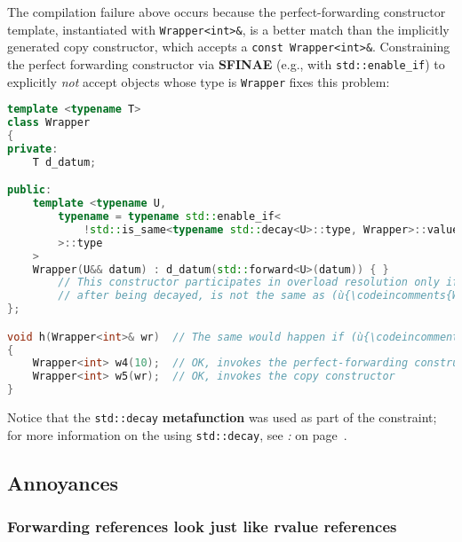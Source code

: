 \noindent The compilation failure above occurs because the perfect-forwarding
constructor template, instantiated with \texttt{Wrapper<int>\&}, is a
better match than the implicitly generated copy constructor, which
accepts a \texttt{const}~\texttt{Wrapper<int>\&}. Constraining the
perfect forwarding constructor via \textbf{SFINAE} (e.g., with
\texttt{std::enable\_if}) to explicitly \emph{not} accept objects whose
type is \texttt{Wrapper} fixes this problem:

\begin{lstlisting}[language=C++]
template <typename T>
class Wrapper
{
private:
    T d_datum;

public:
    template <typename U,
        typename = typename std::enable_if<
            !std::is_same<typename std::decay<U>::type, Wrapper>::value
        >::type
    >
    Wrapper(U&& datum) : d_datum(std::forward<U>(datum)) { }
        // This constructor participates in overload resolution only if (ù{\codeincomments{U}}ù),
        // after being decayed, is not the same as (ù{\codeincomments{Wrapper}}ù).
};

void h(Wrapper<int>& wr)  // The same would happen if (ù{\codeincomments{wr}}ù) were passed by value.
{
    Wrapper<int> w4(10);  // OK, invokes the perfect-forwarding constructor
    Wrapper<int> w5(wr);  // OK, invokes the copy constructor
}
\end{lstlisting}
    
\noindent Notice that the \texttt{std::decay} \textbf{metafunction} was used as
part of the constraint; for more information on the using
\texttt{std::decay}, see \textit{: } on page~\pageref{metafunctions-are-required-in-constraints}.

\subsection[Annoyances]{Annoyances}\label{annoyances-forwardingref}

\subsubsection[Forwarding references look just like rvalue references]{Forwarding references look just like rvalue references}\label{forwarding-references-look-just-like-rvalue-references}

